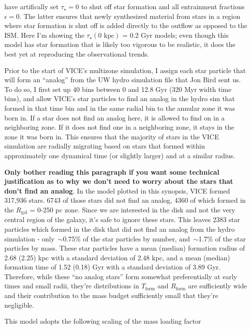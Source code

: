 \documentclass[12pt]{report}
\begin{document}
have artifically set $\tau_\star = 0$ to shut off star formation and all 
entrainment fractions $\epsilon = 0$. The latter ensures that newly 
synthesized material from stars in a region where star formation is shut off 
is added directly to the outflow as opposed to the ISM. Here I'm showing the 
$\tau_\star(0\text{ kpc})$ = 0.2 Gyr models; even though this model has 
star formation that is likely too vigorous to be realistic, it does the best 
yet at reproducing the observational trends. 
\par 
Prior to the start of VICE's multizone simulation, I assign each star particle 
that will form an ``analog'' from the UW hydro simulation file that Jon Bird 
sent us. To do so, I first set up 40 bins between 0 and 12.8 Gyr (320 Myr width 
time bins), and allow VICE's star particles to find an analog in the hydro 
sim that formed in that time bin and in the same radial bin to the annular 
zone it was born in. If a star does not find an analog here, it is allowed 
to find on in a neighboring zone. If it does not find one in a neighboring 
zone, it stays in the zone it was born in. This ensures that the majority of 
stars in the VICE simulation are radially migrating based on stars that formed 
within approximately one dynamical time (or slightly larger) and at a similar 
radius. 
\par 
\textbf{Only bother reading this paragraph if you want some technical 
justification as to why we don't need to worry about the stars that don't 
find an analog}. 
In the model plotted in this synopsis, VICE formed 317,936 stars. 6743 of 
those stars did not find an analog, 4360 of which formed in the 
$R_\text{gal}$ = 0-250 pc zone. Since we are interested in the disk and not 
the very central region of the galaxy, it's safe to ignore these stars. This 
leaves 2383 star particles which formed in the disk that did not 
find an analog from the hydro simulation - only~$\sim$0.75\% of the star 
particles by number, and~$\sim$1.7\% of the star particles by mass. These 
star particles have a mean (median) formation radius of 2.68 (2.25) kpc with a 
standard deviation of 2.48 kpc, and a mean (median) formation time of 
1.52 (0.18) Gyr with a standard deviation of 3.89 Gyr. Therefore, while these 
``no analog stars'' form somewhat preferentially at early times and small 
radii, they're distributions in $T_\text{form}$ and $R_\text{form}$ are 
sufficiently wide and their contribution to the mass budget sufficiently small 
that they're negligible. 
\par 
This model adopts the following scaling of the mass loading factor 
\end{document}
